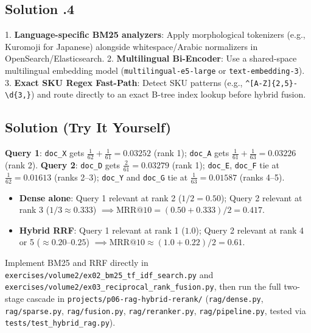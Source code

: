 \subsection*{Solution \thechapter.4}
1. \textbf{Language-specific BM25 analyzers}: Apply morphological tokenizers (e.g., Kuromoji for Japanese) alongside whitespace/Arabic normalizers in OpenSearch/Elasticsearch. 2. \textbf{Multilingual Bi-Encoder}: Use a shared-space multilingual embedding model (\texttt{multilingual-e5-large} or \texttt{text-embedding-3}). 3. \textbf{Exact SKU Regex Fast-Path}: Detect SKU patterns (e.g., \verb|^[A-Z]{2,5}-\d{3,}|) and route directly to an exact B-tree index lookup before hybrid fusion.

\subsection*{Solution (Try It Yourself)}
\textbf{Query 1}: \texttt{doc\_X} gets $\frac{1}{62} + \frac{1}{61} = 0.03252$ (rank 1); \texttt{doc\_A} gets $\frac{1}{61} + \frac{1}{63} = 0.03226$ (rank 2). \textbf{Query 2}: \texttt{doc\_D} gets $\frac{2}{61} = 0.03279$ (rank 1); \texttt{doc\_E}, \texttt{doc\_F} tie at $\frac{1}{62} = 0.01613$ (ranks 2--3); \texttt{doc\_Y} and \texttt{doc\_G} tie at $\frac{1}{63} = 0.01587$ (ranks 4--5).
\begin{itemize}
  \item \textbf{Dense alone}: Query 1 relevant at rank 2 ($1/2 = 0.50$); Query 2 relevant at rank 3 ($1/3 \approx 0.333$) $\implies \text{MRR@10} = (0.50 + 0.333)/2 = 0.417$.
  \item \textbf{Hybrid RRF}: Query 1 relevant at rank 1 ($1.0$); Query 2 relevant at rank 4 or 5 ($\approx 0.20$--$0.25$) $\implies \text{MRR@10} \approx (1.0 + 0.22)/2 = 0.61$.
\end{itemize}

\begin{labbridgebox}
Implement BM25 and RRF directly in \texttt{exercises/volume2/ex02\_bm25\_tf\_idf\_search.py} and \texttt{exercises/volume2/ex03\_reciprocal\_rank\_fusion.py}, then run the full two-stage cascade in \texttt{projects/p06-rag-hybrid-rerank/} (\texttt{rag/dense.py}, \texttt{rag/sparse.py}, \texttt{rag/fusion.py}, \texttt{rag/reranker.py}, \texttt{rag/pipeline.py}, tested via \texttt{tests/test\_hybrid\_rag.py}).
\end{labbridgebox}

